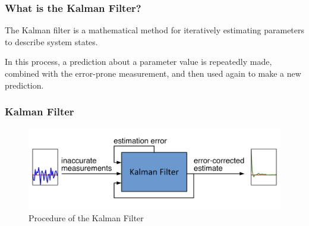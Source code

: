 \documentclass{beamer}
\begin{document}
\begin{frame}
    \frametitle{What is the Kalman Filter?}
    The Kalman filter is a mathematical method for iteratively estimating parameters to describe
    system states.

    In this process, a prediction about a parameter value is repeatedly made, combined with the
    error-prone measurement, and then used again to make a new prediction.
\end{frame}

\begin{frame}
    \frametitle{Kalman Filter}
    \begin{figure}
        \centering
        \includegraphics[width=1\textwidth]{images/graphics/flow.png}
        \caption{Procedure of the Kalman Filter\footnotemark}
    \end{figure}
\end{frame}

\end{document}

